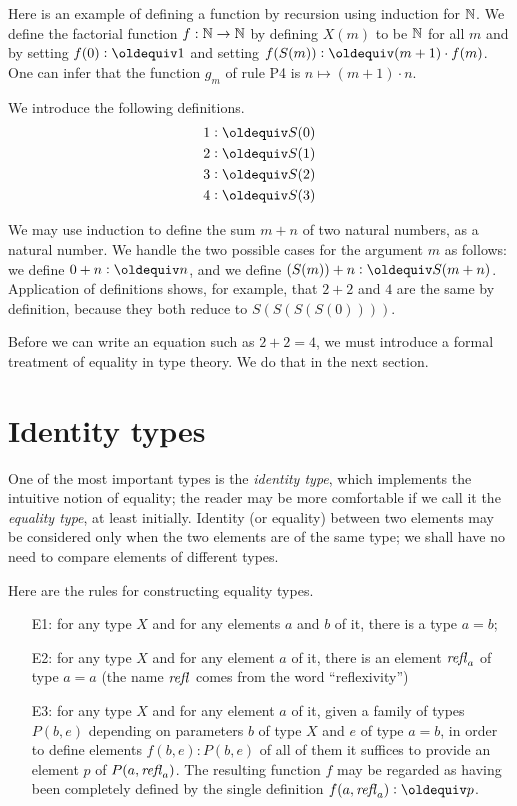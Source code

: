 Here is an example of defining a function by recursion using induction for $\mathbb{N}$.  We define the factorial function $f : \mathbb{N} \to \mathbb{N}$ by
defining $X(m)$ to be $\mathbb{N}$ for all $m$ and by setting $f(0) \defeq 1$ and setting $f(S(m)) \defeq (m+1) \cdot f(m)$.  One can infer that the
function $g_m$ of rule P4 is $n \mapsto (m+1) \cdot n$.

We introduce the following definitions.
\begin{align*}
 1 & \defeq S(0) \\
 2 & \defeq S(1) \\
 3 & \defeq S(2) \\
 4 & \defeq S(3)
\end{align*}

We may use induction to define the sum $m+n$ of two natural numbers, as a natural number.  We handle the two possible cases for the argument $m$
as follows: we define $0+n \defeq n$, and we define $(S(m))+n \defeq S(m+n)$.  Application of definitions shows, for example, that $2+2$ and $4$
are the same by definition, because they both reduce to $S(S(S(S(0))))$.

Before we can write an equation such as $2+2=4$, we must introduce a formal treatment of equality in type theory.  We do that in the next section.

\section{Identity types}
\label{sec:identity-types}

One of the most important types is the \emph{identity type}, which implements the intuitive notion of equality; the reader may be more
comfortable if we call it the \emph{equality type}, at least initially.  Identity (or equality) between two elements may be considered only when
the two elements are of the same type; we shall have no need to compare elements of different types.

Here are the rules for constructing equality types.
\begin{enumerate}
\item[E1:]
  for any type $X$ and for any elements $a$ and $b$ of it, there is a type $a=b$;
\item[E2:] for any type $X$ and for any element $a$ of it, there is an element $\mathop{{\it refl}_{a}}$ of type $a=a$ (the name $\mathop{{\it refl}_{}}$ comes from the word
  ``reflexivity'')
\item[E3:] for any type $X$ and for any element $a$ of it, given a family of types $P(b,e)$ depending on parameters $b$ of type $X$ and $e$ of type
  $a=b$, in order to define elements $f(b,e) : P(b,e)$ of all of them it suffices to provide an element $p$ of $P(a,\mathop{{\it refl}_{a}})$.  The resulting
  function $f$ may be regarded as having been completely defined by the single definition $f(a,\refl a) \defeq p$.
\end{enumerate}


